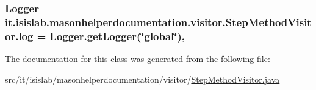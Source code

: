 \hypertarget{classit_1_1isislab_1_1masonhelperdocumentation_1_1visitor_1_1_step_method_visitor_a6ac36412801015cd6a1c3a8b19d55b63}{
\subsubsection[{log}]{\setlength{\rightskip}{0pt plus 5cm}Logger it.\-isislab.\-masonhelperdocumentation.\-visitor.\-Step\-Method\-Visitor.\-log = Logger.\-get\-Logger(\char`\"{}global\char`\"{})\hspace{0.3cm}{\ttfamily [static]}, {\ttfamily [private]}}}\label{classit_1_1isislab_1_1masonhelperdocumentation_1_1visitor_1_1_step_method_visitor_a6ac36412801015cd6a1c3a8b19d55b63}


The documentation for this class was generated from the following file\-:\begin{DoxyCompactItemize}
\item 
src/it/isislab/masonhelperdocumentation/visitor/\hyperlink{_step_method_visitor_8java}{Step\-Method\-Visitor.\-java}\end{DoxyCompactItemize}
